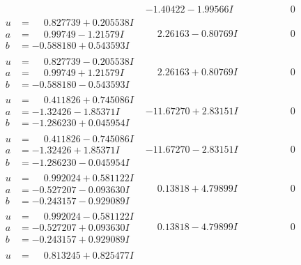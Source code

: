 \documentclass[1p]{elsarticle_modified}
\theoremstyle{definition}
\begin{document}
$$\begin{array}{c|c|c}
 & -1.40422 - 1.99566 I & \phantom{-0.000000 } 0 \\ \hline\begin{aligned}
u &= \phantom{-}0.827739 + 0.205538 I \\
a &= \phantom{-}0.99749 - 1.21579 I \\
b &= -0.588180 + 0.543593 I\end{aligned}
 & \phantom{-}2.26163 - 0.80769 I & \phantom{-0.000000 } 0 \\ \hline\begin{aligned}
u &= \phantom{-}0.827739 - 0.205538 I \\
a &= \phantom{-}0.99749 + 1.21579 I \\
b &= -0.588180 - 0.543593 I\end{aligned}
 & \phantom{-}2.26163 + 0.80769 I & \phantom{-0.000000 } 0 \\ \hline\begin{aligned}
u &= \phantom{-}0.411826 + 0.745086 I \\
a &= -1.32426 - 1.85371 I \\
b &= -1.286230 + 0.045954 I\end{aligned}
 & -11.67270 + 2.83151 I & \phantom{-0.000000 } 0 \\ \hline\begin{aligned}
u &= \phantom{-}0.411826 - 0.745086 I \\
a &= -1.32426 + 1.85371 I \\
b &= -1.286230 - 0.045954 I\end{aligned}
 & -11.67270 - 2.83151 I & \phantom{-0.000000 } 0 \\ \hline\begin{aligned}
u &= \phantom{-}0.992024 + 0.581122 I \\
a &= -0.527207 - 0.093630 I \\
b &= -0.243157 - 0.929089 I\end{aligned}
 & \phantom{-}0.13818 + 4.79899 I & \phantom{-0.000000 } 0 \\ \hline\begin{aligned}
u &= \phantom{-}0.992024 - 0.581122 I \\
a &= -0.527207 + 0.093630 I \\
b &= -0.243157 + 0.929089 I\end{aligned}
 & \phantom{-}0.13818 - 4.79899 I & \phantom{-0.000000 } 0 \\ \hline\begin{aligned}
u &= \phantom{-}0.813245 + 0.825477 I \\

\end{aligned}
\end{array}$$
\end{document}
